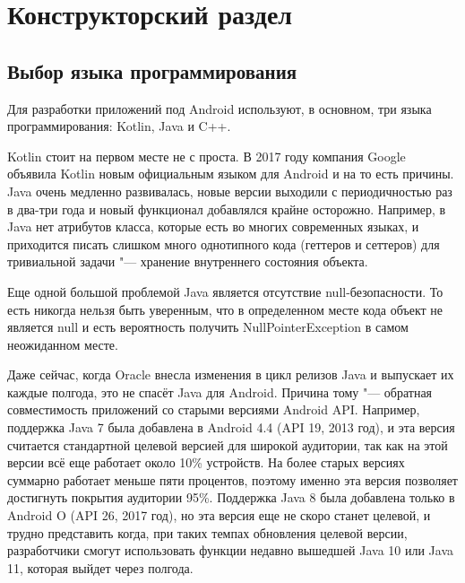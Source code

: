 \chapter{Конструкторский раздел}
\label{ch:design}

\section{Выбор языка программирования}
\label{sec:language}
Для разработки приложений под Android используют, в основном, три языка программирования: Kotlin, Java и C++.

Kotlin стоит на первом месте не с проста.
В 2017 году компания Google объявила Kotlin новым официальным языком для Android и на то есть причины.
Java очень медленно развивалась, новые версии выходили с периодичностью раз в два-три года и новый функционал добавлялся крайне осторожно.
Например, в Java нет атрибутов класса, которые есть во многих современных языках, и приходится писать слишком много однотипного кода (геттеров и сеттеров) для тривиальной задачи "--- хранение внутреннего состояния объекта.

Еще одной большой проблемой Java является отсутствие null-безопасности.
То есть никогда нельзя быть уверенным, что в определенном месте кода объект не является null и есть вероятность получить NullPointerException в самом неожиданном месте.

Даже сейчас, когда Oracle внесла изменения в цикл релизов Java и выпускает их каждые полгода, это не спасёт Java для Android.
Причина тому "--- обратная совместимость приложений со старыми версиями Android API\@.
Например, поддержка Java 7 была добавлена в Android 4.4 (API 19, 2013 год), и эта версия считается стандартной целевой версией для широкой аудитории, так как на этой версии всё еще работает около 10\% устройств.
На более старых версиях суммарно работает меньше пяти процентов, поэтому именно эта версия позволяет достигнуть покрытия аудитории 95\%.
Поддержка Java 8 была добавлена только в Android O (API 26, 2017 год), но эта версия еще не скоро станет целевой, и трудно представить когда, при таких темпах обновления целевой версии, разработчики смогут использовать функции недавно вышедшей Java 10 или Java 11, которая выйдет через полгода.


